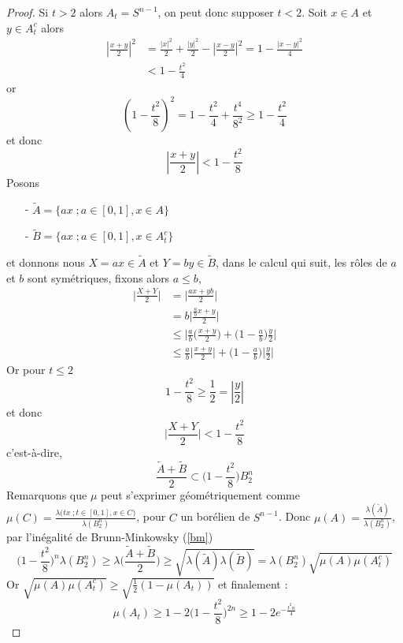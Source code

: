 \documentclass[12pt]{article}
\theoremstyle{definition}
\begin{document}
\begin{proof}
	Si $t>2$ alors $A_t=S^{n-1}$, on peut donc supposer $t<2$. Soit $x\in A$ et $y\in A^{c}_t$ alors \begin{align*}
	\left|\frac{x+y}{2}\right|^2&=\frac{|x|^2}{2}+\frac{|y|^2}{2}-\left|\frac{x-y}{2}\right|^2=1-\frac{|x-y|^2}{4}\\
	&< 1-\frac{t^2}{4}
	\end{align*}
	or 
	\begin{equation*}
	(1-\frac{t^2}{8})^2 =1-\frac{t^2}{4}+\frac{t^4}{8^2}\geq 1-\frac{t^2}{4}
	\end{equation*}
	et donc 
	\begin{equation*}
	\left|\frac{x+y}{2}\right|< 1-\frac{t^2}{8}
	\end{equation*}
	Posons \begin{enumerate}
		\item[-] $\tilde{A}=\big\{ax\;; a\in[0,1], x\in A\big\}$ 
		\item[-]  $\tilde{B}=\big\{ax\;; a\in[0,1], x\in A_t^c\big\}$
	\end{enumerate} 
	et donnons nous $X=ax\in \tilde{A}$ et $Y=by\in \tilde{B}$, dans le calcul qui suit, les rôles de $a$ et $b$ sont symétriques, fixons alors $a\leq b$,
	\begin{align*}
	\Big|\frac{X+Y}{2}\Big|&= \Big|\frac{ax+yb}{2}\Big|\\
	&=b\Big|\frac{\frac{a}{b}x+y}{2}\Big|\\
	&\leq \Big|\frac{a}{b}\big(\frac{x+y}{2}\big)+\big(1-\frac{a}{b}\big)\frac{y}{2}\Big|\\
	&\leq \frac{a}{b}\Big|\frac{x+y}{2}\Big|+\big(1-\frac{a}{b}\big)\big|\frac{y}{2}\big|
	\end{align*}
	Or pour $t\leq 2$
	\begin{equation*}
	1-\frac{t^2}{8}\geq \frac{1}{2} = |\frac{y}{2}|
	\end{equation*}
	et donc 
	\begin{equation*}
	\Big|\frac{X+Y}{2}\Big|< 1-\frac{t^2}{8}
	\end{equation*}
	c'est-à-dire,
	\begin{equation*}
	\frac{\tilde{A}+\tilde{B}}{2}\subset \big(1-\frac{t^2}{8}\big)B^n_2
	\end{equation*}
	Remarquons que $\mu$ peut s'exprimer géométriquement comme $\mu(C)=\frac{\lambda\big(tx \; ; t\in[0,1], x\in C \big)}{\lambda(B^n_2)}$, pour $C$ un borélien de $S^{n-1}$. Donc $\mu(A)=\frac{\lambda(\tilde{A})}{\lambda(B^n_2)}$, par l'inégalité de Brunn-Minkowsky (\cref{bm})
	\begin{equation*}
	\big(1-\frac{t^2}{8}\big)^{n}\lambda(B^n_2)\geq \lambda\big(\frac{\tilde{A}+\tilde{B}}{2}\big)\geq \sqrt{\lambda(\tilde{A})\lambda(\tilde{B})}=\lambda(B^n_2)\sqrt{\mu(A)\mu(A_t^c)}
	\end{equation*}
	Or $\sqrt{\mu(A)\mu(A_t^c)}\geq\sqrt{\frac{1}{2}(1-\mu(A_t))}$ et finalement :
	\begin{equation*}
	\mu(A_t)\geq 1 - 2 \big(1-\frac{t^2}{8}\big)^{2n}\geq 1 - 2 e^{-\frac{t^2n}{4}}
	\end{equation*}
\end{proof}
\end{document}
